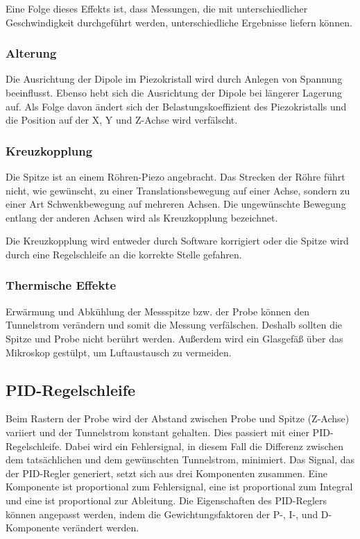 Eine Folge dieses Effekts ist, dass Messungen, die mit unterschiedlicher Geschwindigkeit durchgeführt werden, unterschiedliche Ergebnisse liefern können.

\subsubsection{Alterung}
Die Ausrichtung der Dipole im Piezokristall wird durch Anlegen von Spannung beeinflusst.
Ebenso hebt sich die Ausrichtung der Dipole bei längerer Lagerung auf.
Als Folge davon ändert sich der Belastungskoeffizient des Piezokristalls und die Position auf der X, Y und Z-Achse wird verfälscht.

\subsubsection{Kreuzkopplung}

Die Spitze ist an einem Röhren-Piezo angebracht.
Das Strecken der Röhre führt nicht, wie gewünscht, zu einer Translationsbewegung auf einer Achse, sondern zu einer Art Schwenkbewegung auf mehreren Achsen.
Die ungewünschte Bewegung entlang der anderen Achsen wird als Kreuzkopplung bezeichnet.

Die Kreuzkopplung wird entweder durch Software korrigiert oder die Spitze wird durch eine Regelschleife an die korrekte Stelle gefahren.

\subsubsection{Thermische Effekte}
Erwärmung und Abkühlung der Messspitze bzw. der Probe können den Tunnelstrom verändern und somit die Messung verfälschen.
Deshalb sollten die Spitze und Probe nicht berührt werden.
Außerdem wird ein Glasgefäß über das Mikroskop gestülpt, um Luftaustausch zu vermeiden.

\subsection{PID-Regelschleife}
Beim Rastern der Probe wird der Abstand zwischen Probe und Spitze (Z-Achse) variiert und der Tunnelstrom konstant gehalten.
Dies passiert mit einer PID-Regelschleife.
Dabei wird ein Fehlersignal, in diesem Fall die Differenz zwischen dem tatsächlichen und dem gewünschten Tunnelstrom, minimiert.
Das Signal, das der PID-Regler generiert, setzt sich aus drei Komponenten zusammen. Eine Komponente ist proportional zum Fehlersignal, eine ist proportional zum Integral und eine ist proportional zur Ableitung.
Die Eigenschaften des PID-Reglers können angepasst werden, indem die Gewichtungsfaktoren der P-, I-, und D-Komponente verändert werden.